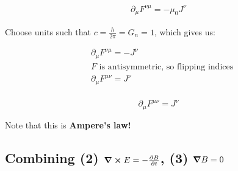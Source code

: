 \begin{align*}
    \partial_\mu F^{\nu \mu} = - \mu_0 J^{\nu}
\end{align*}

Choose units such that $c = \frac{h}{2 \pi} = G_n = 1$, which gives us:


\begin{align*}
    &\partial_\mu F^{\nu \mu} = -  J^{\nu} \\
    &\text{$F$ is antisymmetric, so flipping indices} \\
    &\partial_\mu F^{\mu \nu} =  J^{\nu} \\
\end{align*}

\begin{equation}
    \boxed{ \partial_\mu F^{\mu \nu} =  J^{\nu} }
\end{equation}

Note that this is \textbf{Ampere's law!}

\subsection{Combining (2) $\curl E = - \pdv{B}{t}$, (3) $\grad B = 0$}


